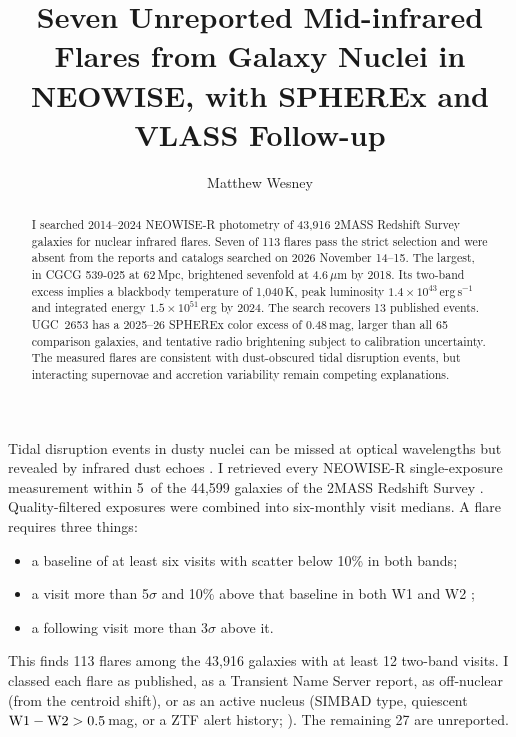 \documentclass{aastex701}
\begin{document}
\title{Seven Unreported Mid-infrared Flares from Galaxy Nuclei in NEOWISE, with SPHEREx and VLASS Follow-up}

\author[0000-0000-0000-0000]{Matthew Wesney} %

\begin{abstract}
I searched 2014--2024 NEOWISE-R photometry of 43,916 2MASS Redshift Survey galaxies for nuclear infrared flares. Seven of 113 flares pass the strict selection and were absent from the reports and catalogs searched on 2026 November 14--15. The largest, in CGCG 539-025 at 62\,Mpc, brightened sevenfold at 4.6\,$\mu$m by 2018. Its two-band excess implies a blackbody temperature of 1,040\,K, peak luminosity $1.4\times10^{43}$\,erg\,s$^{-1}$ and integrated energy $1.5\times10^{51}$\,erg by 2024. The search recovers 13 published events. UGC~2653 has a 2025--26 SPHEREx color excess of 0.48\,mag, larger than all 65 comparison galaxies, and tentative radio brightening subject to calibration uncertainty. The measured flares are consistent with dust-obscured tidal disruption events, but interacting supernovae and accretion variability remain competing explanations.
\end{abstract}


Tidal disruption events in dusty nuclei can be missed at optical wavelengths but revealed by infrared dust echoes \citep{2021ApJS..252...32J,2024ApJ...961..211M,2025A&A...695A.228N}. I retrieved every NEOWISE-R single-exposure measurement \citep{2014ApJ...792...30M} within 5\arcsec\ of the 44,599 galaxies of the 2MASS Redshift Survey \citep{2012ApJS..199...26H}. Quality-filtered exposures were combined into six-monthly visit medians. A flare requires three things:
\begin{itemize}
\item a baseline of at least six visits with scatter below 10\% in both bands;
\item a visit more than 5$\sigma$ and 10\% above that baseline in both W1 and W2 \citep{2010AJ....140.1868W};
\item a following visit more than 3$\sigma$ above it.
\end{itemize}
This finds 113 flares among the 43,916 galaxies with at least 12 two-band visits. I classed each flare as published, as a Transient Name Server report, as off-nuclear (from the centroid shift), or as an active nucleus (SIMBAD type, quiescent ${\rm W1}-{\rm W2}>0.5$\,mag, or a ZTF alert history; \citealt{2021AJ....161..242F}). The remaining 27 are unreported.
\end{document}
